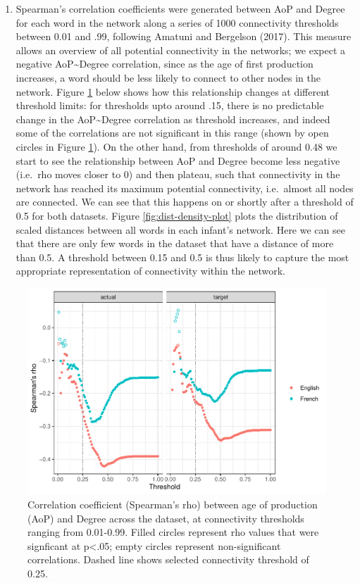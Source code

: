 \documentclass[
  man,floatsintext]{apa6}
\providecommand{\tightlist}{%
  \setlength{\itemsep}{0pt}\setlength{\parskip}{0pt}}
\begin{document}
\begin{enumerate}
\def\labelenumi{\arabic{enumi})}
\tightlist
\item
  Spearman's correlation coefficients were generated between AoP and Degree for each word in the network along a series of 1000 connectivity thresholds between 0.01 and .99, following Amatuni and Bergelson (2017). This measure allows an overview of all potential connectivity in the networks; we expect a negative AoP\textasciitilde Degree correlation, since as the age of first production increases, a word should be less likely to connect to other nodes in the network. Figure \ref{fig:aop-degree-correlation} below shows how this relationship changes at different threshold limits: for thresholds upto around .15, there is no predictable change in the AoP\textasciitilde Degree correlation as threshold increases, and indeed some of the correlations are not significant in this range (shown by open circles in Figure \ref{fig:aop-degree-correlation}). On the other hand, from thresholds of around 0.48 we start to see the relationship between AoP and Degree become less negative (i.e.~rho moves closer to 0) and then plateau, such that connectivity in the network has reached its maximum potential connectivity, i.e.~almost all nodes are connected. We can see that this happens on or shortly after a threshold of 0.5 for both datasets. Figure \ref{fig:dist-density-plot} plots the distribution of scaled distances between all words in each infant's network. Here we can see that there are only few words in the dataset that have a distance of more than 0.5. A threshold between 0.15 and 0.5 is thus likely to capture the most appropriate representation of connectivity within the network.
\end{enumerate}

\begin{figure}
\centering
\includegraphics{PhonNetworksSupplementaryData_files/figure-latex/aop-degree-correlation-1.pdf}
\caption{\label{fig:aop-degree-correlation}Correlation coefficient (Spearman's rho) between age of production (AoP) and Degree across the dataset, at connectivity thresholds ranging from 0.01-0.99. Filled circles represent rho values that were signficant at p\textless.05; empty circles represent non-significant correlations. Dashed line shows selected connectivity threshold of 0.25.}
\end{figure}
\end{document}
